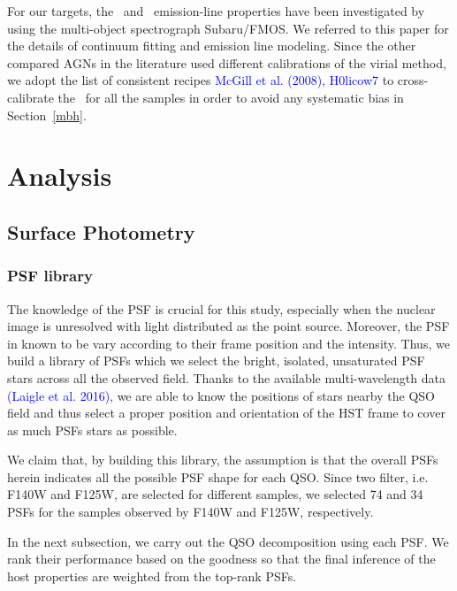 \documentclass[apj]{emulateapj}
\begin{document}
For our targets, the \halpha\ and \hbeta\ emission-line properties have been investigated by \citet{Schulze2018} using the multi-object spectrograph Subaru/FMOS. We referred to this paper for the details of continuum fitting and emission line modeling. Since the other compared AGNs in the literature used different calibrations of the virial method, we adopt the list of consistent recipes \textcolor{blue}{McGill et al. (2008), H0licow7} to cross-calibrate the \mbh\ for all the samples in order to avoid any systematic bias in Section~\ref{mbh}.
 
\section{Analysis}
\label{sec:Analysis}

\subsection{Surface Photometry}
\subsubsection{PSF library}    
\label{sec:psf_library}
The knowledge of the PSF is crucial for this study, especially when the nuclear image is unresolved with light distributed as the point source. Moreover, the PSF in known to be vary according to their frame position and the intensity. Thus, we build a library of PSFs which we select the bright, isolated, unsaturated PSF stars across all the observed field. Thanks to the available multi-wavelength data \textcolor{blue}{(Laigle et al. 2016)}, we are able to know the positions of stars nearby the QSO field and thus select a proper position and orientation of the HST frame to cover as much PSFs stars as possible. 

We claim that, by building this library, the assumption is that the overall PSFs herein indicates all the possible PSF shape for each QSO. Since two filter, i.e. F140W and F125W, are selected for different samples, we selected 74 and 34 PSFs for the samples observed by F140W and F125W, respectively.

In the next subsection, we carry out the QSO decomposition using each PSF. We rank their performance based on the goodness so that the final inference of the host properties are weighted from the top-rank PSFs.
\end{document}
